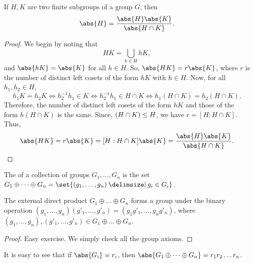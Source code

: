 \documentclass[11pt]{penrose}
\begin{document}
\begin{nthm}
    If $H, K$ are two finite subgroups of a group $G$, then
    \begin{equation*}
        \abs{H} = \frac{\abs{H} \abs{K}}{\abs{H \cap K}}.
    \end{equation*}
\end{nthm}
\begin{proof}
    We begin by noting that
    \begin{equation*}
        HK = \bigcup_{h \in H} hK,
    \end{equation*}
    and $\abs{hK} = \abs{K}$ for all $h \in H$. So, $\abs{HK} = r \abs{K}$, where $r$ is the number of distinct left cosets of the form $hK$ with $h \in H$. Now, for all $h_{1}, h_{2} \in H$,
    \begin{equation*}
        h_{1} K = h_{2} K
        \iff h_{2}^{-1} h_{1} \in K
        \iff h_{2}^{-1} h_{1} \in H \cap K
        \iff h_{1} (H \cap K) = h_{2} (H \cap K).
    \end{equation*}
    Therefore, the number of distinct left cosets of the form $hK$ and those of the form $h (H \cap K)$ is the same. Since, $(H \cap K) \mathrel{\leq} H$, we have $r = [H : H \cap K]$. Thus,
    \begin{equation*}
        \abs{HK} = r \abs{K} = [H : H \cap K] \abs{K} = \frac{\abs{H}\abs{K}}{\abs{H \cap K}}.
        \qedhere
    \end{equation*}
\end{proof}

\begin{ndfn}
    The  of a collection of groups $G_{1}, \dots, G_{n}$ is the set $G_{1} \oplus \dots \oplus G_{n} = \set{ (g_{1}, \dots, g_{n}) \st g_{i} \in G_{i} }$.
\end{ndfn}

\begin{nthm}
    The external direct product $G_{1} \oplus \dots \oplus G_{n}$ forms a group under the binary operation $(g_{1}, \dots, g_{n}) (g'_{1}, \dots, g'_{n}) = (g_{1}g'_{1}, \dots, g_{n}g'_{n})$,
    where $(g_{1}, \dots, g_{n}), (g'_{1}, \dots, g'_{n}) \in G_{1} \oplus \dots \oplus G_{n}$.
\end{nthm}
\begin{proof}
    Easy exercise. We simply check all the group axioms.
\end{proof}

\begin{remark}
    It is easy to see that if $\abs{G_{i}} = r_{i}$, then $\abs{ G_{1} \oplus \dots \oplus G_{n} } = r_{1} r_{2} \dots r_{n}$.
\end{remark}
\end{document}
